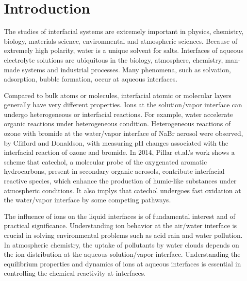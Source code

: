 \chapter{Introduction}\label{CHAPETR_1}

The studies of interfacial systems are extremely important in physics, chemistry, biology, materials science, environmental and atmospheric sciences.
Because of extremely high polarity, water is a unique solvent for salts.
Interfaces of aqueous electrolyte solutions are ubiquitous in the biology, atmosphere, chemistry, man-made systems 
and industrial processes\cite{Irwin88,Tobias99, Benderskii00, 
Asahi01,Benderskii02,Richmond02,LiuH04,
TianCS08,Yamamoto2008, Salmeron2009,ZhangLY09,
LoNostro2012,Piatkowski2014,Balajka2018}.
Many phenomena, such as solvation, adsorption\cite{Chang06}, bubble formation\cite{Craig1993,Craig1993b,Weissenborn1995,Marcelja04,Craig04},
occur at aqueous interfaces\cite{Ball2008,Kuo2004b}. 

Compared to bulk atoms or molecules, interfacial atomic or molecular layers generally have very different properties. 
Ions at the solution/vapor interface can undergo heterogeneous or interfacial reactions\cite{HuJH95,LiuDF04,Clifford07,Manna13,Pillar2014}.
For example, water accelerate organic reactions under heterogeneous condition\cite{Manna13}. 
Heterogeneous reactions of ozone with bromide at the water/vapor interface of NaBr aerosol were observed, 
by Clifford and Donaldson, with measuring pH changes associated with the interfacial reaction of ozone and bromide\cite{Clifford07}.
In 2014, Pillar et.al.'s work shows a scheme that catechol, a molecular probe of the oxygenated aromatic hydrocarbons, 
present in secondary organic aerosols, contribute interfacial reactive species, which enhance the production 
of humic-like substances under atmospheric conditions\cite{Pillar2014}. It also implys that catechol undergoes fast oxidation 
at the water/vapor interface by some competing pathways.

The influence of ions on the liquid interfaces is of fundamental interest
and of practical significance. 
Understanding ion behavior at the air/water interface is crucial in solving environmental problems such as acid
rain and water pollution.\cite{Chang06} In atmospheric chemistry,
the uptake of pollutants by water clouds depends on the ion
distribution at the aqueous solution/vapor interface. Understanding the equilibrium properties and dynamics of ions at
aqueous interfaces is essential in controlling the chemical reactivity at interfaces.

